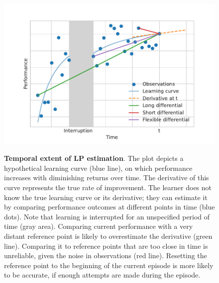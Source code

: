 \begin{figure}[bth]
    \centering
    {\includegraphics[width=.8\linewidth]{Figures/c5/lptw.pdf}}
    \caption[]{\textbf{Temporal extent of \ac{LP} estimation}. The plot depicts a hypothetical learning curve (blue line), on which performance increases with diminishing returns over time. The derivative of this curve represents the true rate of improvement. The learner does not know the true learning curve or its derivative; they can estimate it by comparing performance outcomes at different points in time (blue dots). Note that learning is interrupted for an unspecified period of time (gray area). Comparing current performance with a very distant reference point is likely to overestimate the derivative (green line). Comparing it to reference points that are too close in time is unreliable, given the noise in observations (red line). Resetting the reference point to the beginning of the current episode is more likely to be accurate, if enough attempts are made during the episode.}\label{fig:5-lptw}
\end{figure}


